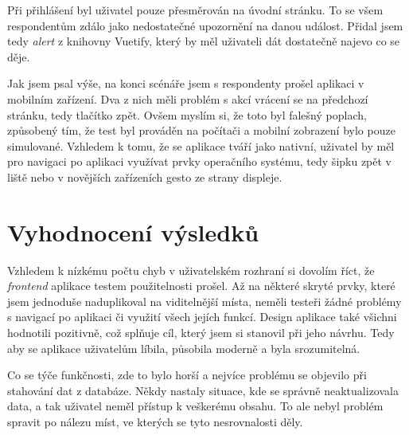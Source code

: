 Při přihlášení byl uživatel pouze přesměrován na úvodní stránku. To se všem respondentům zdálo jako nedostatečné upozornění na danou událost.
Přidal jsem tedy \emph{alert} z knihovny Vuetify, který by měl uživateli dát dostatečně najevo co se děje.

Jak jsem psal výše, na konci scénáře jsem s respondenty prošel aplikaci v mobilním zařízení. Dva z nich měli problém s akcí vrácení se na předchozí stránku,
tedy tlačítko zpět. Ovšem myslím si, že toto byl falešný poplach, způsobený tím, že test byl prováděn na počítači a mobilní zobrazení bylo pouze simulované.
Vzhledem k tomu, že se aplikace tváří jako nativní, uživatel by měl pro navigaci po aplikaci využívat prvky operačního systému, tedy šipku zpět v liště nebo
v novějších zařízeních gesto ze strany displeje.

\section{Vyhodnocení výsledků}

Vzhledem k nízkému počtu chyb v uživatelském rozhraní si dovolím říct, že \emph{frontend} aplikace testem použitelnosti prošel. Až na některé
skryté prvky, které jsem jednoduše naduplikoval na viditelnější místa, neměli testeři žádné problémy s navigací po aplikaci či využití
všech jejích funkcí. Design aplikace také všichni hodnotili pozitivně, což splňuje cíl, který jsem si stanovil při jeho návrhu. Tedy aby
se aplikace uživatelům líbila, působila moderně a byla srozumitelná.

Co se týče funkčnosti, zde to bylo horší a nejvíce problému se objevilo při stahování dat z databáze. Někdy nastaly situace, kde se správně
neaktualizovala data, a tak uživatel neměl přístup k veškerému obsahu. To ale nebyl problém spravit po nálezu míst, ve kterých se tyto nesrovnalosti
děly.

